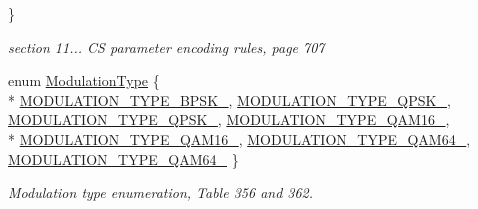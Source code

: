 \begin{DoxyCompactItemize}
 \}\begin{DoxyCompactList}\small\item\em section 11... CS parameter encoding rules, page 707 \end{DoxyCompactList}
\item 
enum \hyperlink{classns3_1_1ServiceFlow_a40bfe31290c97789bf10adffd8b1acad}{Modulation\+Type} \{ \\*
\hyperlink{classns3_1_1ServiceFlow_a40bfe31290c97789bf10adffd8b1acadae9121cf6eb75ccb2da96d3be64ed1bdb}{M\+O\+D\+U\+L\+A\+T\+I\+O\+N\+\_\+\+T\+Y\+P\+E\+\_\+\+B\+P\+S\+K\+\_}, 
\hyperlink{classns3_1_1ServiceFlow_a40bfe31290c97789bf10adffd8b1acadaa1cd67cb4b29b4e78bf9c0828b0cafe6}{M\+O\+D\+U\+L\+A\+T\+I\+O\+N\+\_\+\+T\+Y\+P\+E\+\_\+\+Q\+P\+S\+K\+\_}, 
\hyperlink{classns3_1_1ServiceFlow_a40bfe31290c97789bf10adffd8b1acadaacf3950bfd6b7265f68b657c0a4eeb97}{M\+O\+D\+U\+L\+A\+T\+I\+O\+N\+\_\+\+T\+Y\+P\+E\+\_\+\+Q\+P\+S\+K\+\_}, 
\hyperlink{classns3_1_1ServiceFlow_a40bfe31290c97789bf10adffd8b1acada2ff5a1fcfd105f98f4341e2e1ec6288c}{M\+O\+D\+U\+L\+A\+T\+I\+O\+N\+\_\+\+T\+Y\+P\+E\+\_\+\+Q\+A\+M16\+\_}, 
\\*
\hyperlink{classns3_1_1ServiceFlow_a40bfe31290c97789bf10adffd8b1acada3ecb4ad5848841bc90258a225061edda}{M\+O\+D\+U\+L\+A\+T\+I\+O\+N\+\_\+\+T\+Y\+P\+E\+\_\+\+Q\+A\+M16\+\_}, 
\hyperlink{classns3_1_1ServiceFlow_a40bfe31290c97789bf10adffd8b1acada6a7e0bcf9c33214134446b1e88fab5c3}{M\+O\+D\+U\+L\+A\+T\+I\+O\+N\+\_\+\+T\+Y\+P\+E\+\_\+\+Q\+A\+M64\+\_}, 
\hyperlink{classns3_1_1ServiceFlow_a40bfe31290c97789bf10adffd8b1acada5885f8d0549d0713b9783152612e7ea8}{M\+O\+D\+U\+L\+A\+T\+I\+O\+N\+\_\+\+T\+Y\+P\+E\+\_\+\+Q\+A\+M64\+\_}
 \}\begin{DoxyCompactList}\small\item\em Modulation type enumeration, Table 356 and 362. \end{DoxyCompactList}
\end{DoxyCompactItemize}
